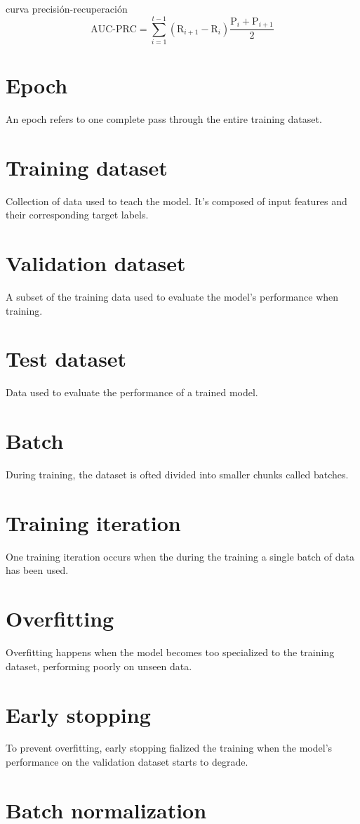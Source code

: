 \section{}
curva precisión-recuperación
\begin{equation}
  \text{AUC-PRC} = \sum_{i=1}^{t-1}(\text{R}_{i+1}-\text{R}_i)\frac{\text{P}_i+\text{P}_{i+1}}{2}
\end{equation}

\section{Epoch}
An epoch refers to one complete pass through the entire training dataset.

\section{Training dataset}
Collection of data used to teach the model. It's composed of input
features and their corresponding target labels.

\section{Validation dataset}
A subset of the training data used to evaluate the model's performance
when training.

\section{Test dataset}
Data used to evaluate the performance of a trained model.

\section{Batch}
During training, the dataset is ofted divided into smaller chunks
called batches.

\section{Training iteration}
One training iteration occurs when the during the training a single
batch of data has been used.

\section{Overfitting}
Overfitting happens when the model becomes too specialized to the
training dataset, performing poorly on unseen data.

\section{Early stopping}
To prevent overfitting, early stopping fialized the training when the
model's performance on the validation dataset starts to degrade.

\section{Batch normalization}
